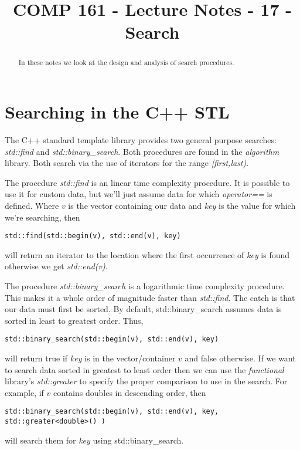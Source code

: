 \documentclass[]{tufte-handout}
\title{COMP 161 - Lecture Notes - 17 - Search}
\begin{document}
 
\maketitle

\begin{abstract}
In these notes we look at the design and analysis of search procedures.
\end{abstract}


\section{Searching in the C++ STL}

The C++ standard template library provides two general purpose searches: \textit{std::find} and \textit{std::binary\_search}. Both procedures are found in the \textit{algorithm} library. Both search via the use of iterators for the range \textit{[first,last)}.  

The procedure \textit{std::find} is an linear time complexity procedure. It is possible to use it for custom data, but we'll just assume data for which \textit{operator==} is defined. Where $v$ is the vector containing our data and \textit{key} is the value for which we're searching, then 
\begin{verbatim}
std::find(std::begin(v), std::end(v), key)
\end{verbatim} 
will return an iterator to the location where the first occurrence of \textit{key} is found otherwise we get \textit{std::end(v)}. 

The procedure \textit{std::binary\_search} is a logarithmic time complexity procedure. This makes it a whole order of magnitude faster than \textit{std::find}. The catch is that our data must first be sorted. By default, std::binary\_search assumes data is sorted in least to greatest order. Thus, 
\begin{verbatim}
std::binary_search(std::begin(v), std::end(v), key)
\end{verbatim}
will return true if \textit{key} is in the vector/container $v$ and false otherwise. If we want to search data sorted in greatest to least order then we can use the \textit{functional} library's \textit{std::greater} to specify the proper comparison to use in the search. For example, if $v$ contains doubles in descending order, then
\begin{verbatim}
std::binary_search(std::begin(v), std::end(v), key, std::greater<double>() )
\end{verbatim}
will search them for \textit{key} using std::binary\_search.
\end{document}

